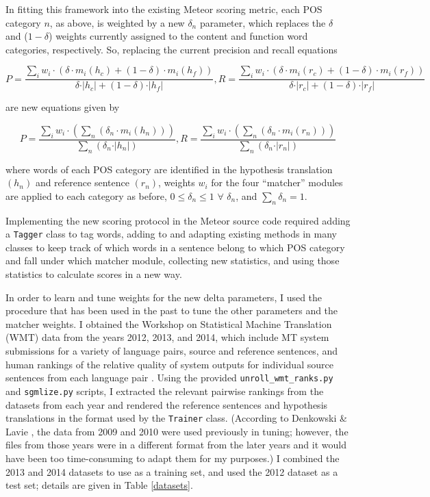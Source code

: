 \documentclass[paper=a4, fontsize=11pt]{scrartcl}
\numberwithin{equation}{section}		%
\numberwithin{figure}{section}			%
\numberwithin{table}{section}				%
\begin{document}
In fitting this framework into the existing Meteor scoring metric, each POS category $n$, as above, is weighted by a new $\delta_n$ parameter, which replaces the $\delta$ and ($1 - \delta$) weights currently assigned to the content and function word categories, respectively.  So, replacing the current precision and recall equations

$$ P = \frac{ \sum_i w_i \cdot (\delta \cdot m_i (h_c) + (1-\delta) \cdot m_i (h_f)) }{ \delta \cdot \vert h_c \vert + (1-\delta) \cdot \vert h_f \vert  }, R = \frac{ \sum_i w_i \cdot (\delta \cdot m_i (r_c) + (1-\delta) \cdot m_i (r_f)) }{ \delta \cdot \vert r_c \vert + (1-\delta) \cdot \vert r_f \vert }$$

\noindent are new equations given by

$$ P = \frac{ \sum_i w_i \cdot (\sum_n ( \delta_n \cdot m_i (h_n))) }{ \sum_n (\delta_n \cdot \vert h_n \vert )  }, R = \frac{ \sum_i w_i \cdot (\sum_n ( \delta_n \cdot m_i (r_n))) }{ \sum_n (\delta_n \cdot \vert r_n \vert )} $$

\noindent where words of each POS category are identified in the hypothesis translation $(h_n)$ and reference sentence $(r_n)$, weights $w_i$ for the four ``matcher'' modules are applied to each category as before, $0 \leq \delta_n \leq 1 \hspace{4pt} \forall \hspace{4pt} \delta_n$, and $\sum_n \delta_n = 1$.

Implementing the new scoring protocol in the Meteor source code required adding a \texttt{Tagger} class to tag words, adding to and adapting existing methods in many classes to keep track of which words in a sentence belong to which POS category and fall under which matcher module, collecting new statistics, and using those statistics to calculate scores in a new way.

In order to learn and tune weights for the new delta parameters, I used the procedure that has been used in the past to tune the other parameters and the matcher weights.  I obtained the Workshop on Statistical Machine Translation (WMT) data from the years 2012, 2013, and 2014, which include MT system submissions for a variety of language pairs, source and reference sentences, and human rankings of the relative quality of system outputs for individual source sentences from each language pair \cite{wmt} .  Using the provided \texttt{unroll\_wmt\_ranks.py} and \texttt{sgmlize.py} scripts, I extracted the relevant pairwise rankings from the datasets from each year and rendered the reference sentences and hypothesis translations in the format used by the \texttt{Trainer} class.  (According to Denkowski \& Lavie \cite{DKLV11}, the data from 2009 and 2010 were used previously in tuning; however, the files from those years were in a different format from the later years and it would have been too time-consuming to adapt them for my purposes.)  I combined the 2013 and 2014 datasets to use as a training set, and used the 2012 dataset as a test set; details are given in Table \ref{datasets}.
\end{document}

